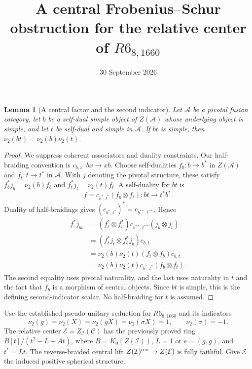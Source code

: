 \documentclass[11pt]{article}
\title{A central Frobenius--Schur obstruction for the relative center of $R6_{8,1660}$}
\author{}\date{30 September 2026}
\newtheorem{lemma}{Lemma}\newtheorem{proposition}{Proposition}
\newcommand{\I}{\mathcal I}\newcommand{\E}{\mathcal E}\newcommand{\C}{\mathcal C}
\begin{document}
\maketitle
\begin{lemma}[A central factor and the second indicator]
Let $\mathcal A$ be a pivotal fusion category, let $b$ be a self-dual
simple object of $Z(\mathcal A)$ whose underlying object is simple, and
let $t$ be self-dual and simple in $\mathcal A$. If $bt$ is simple,
then $\nu_2(bt)=\nu_2(b)\nu_2(t)$.
\end{lemma}
\begin{proof}
We suppress coherent associators and duality constraints. Our
half-braiding convention is $c_{b,x}:bx\longrightarrow xb$.
Choose self-dualities $f_b:b\to b^*$ in $Z(\mathcal A)$ and
$f_t:t\to t^*$ in $\mathcal A$. With $j$ denoting the pivotal structure,
these satisfy $f_b^*j_b=\nu_2(b)f_b$ and
$f_t^*j_t=\nu_2(t)f_t$. A self-duality for $bt$ is
\[
 f=c_{b^*,t^*}(f_b\otimes f_t):bt\longrightarrow t^*b^*.
\]
Duality of half-braidings gives
$(c_{b^*,t^*})^*=c_{b^{**},t^{**}}$. Hence
\begin{align*}
 f^*j_{bt}
 &=(f_t^*\otimes f_b^*)c_{b^{**},t^{**}}(j_b\otimes j_t)\\
 &=(f_t^*j_t\otimes f_b^*j_b)c_{b,t}\\
 &=\nu_2(b)\nu_2(t)(f_t\otimes f_b)c_{b,t}\\
 &=\nu_2(b)\nu_2(t)c_{b^*,t^*}(f_b\otimes f_t).
\end{align*}
The second equality uses pivotal naturality, and the last uses naturality
in $t$ and the fact that $f_b$ is a morphism of central objects. Since
$bt$ is simple, this is the defining second-indicator scalar.
No half-braiding for $t$ is assumed.
\end{proof}

Use the established pseudo-unitary reduction for $R6_{8,1660}$ and
its indicators
\[
 \nu_2(g)=\nu_2(X)=\nu_2(gX)=\nu_2(\sigma X)=1,
 \qquad\nu_2(\sigma)=-1.
\]
The relative center $\E=Z_{\I}(\C)$ has the previously proved ring
$B[t]/(t^2-L-At)$, where $B=K_0(Z(\I))$, $L=1$ or
$e=(g,g)$, and $t^*=Lt$. The reverse-braided central lift
$Z(\I)^{\rm rev}\to Z(\E)$ is fully faithful. Give $\E$ the induced
positive spherical structure.
\end{document}
